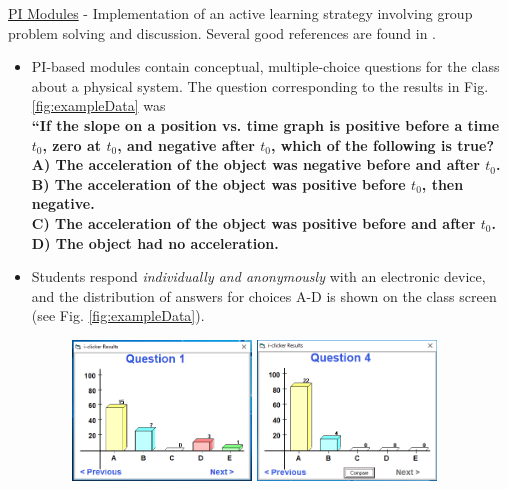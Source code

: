 \documentclass[../../../main.tex]{subfiles}
\begin{document}
\underline{PI Modules} - Implementation of an active learning strategy involving group problem solving and discussion.  Several good references are found in \cite{mazur2013peer} \cite{AAPTPI} \cite{PhysPort}.
\begin{itemize}
\item PI-based modules contain conceptual, multiple-choice questions for the class about a physical system.  The question corresponding to the results in Fig. \ref{fig:exampleData} was \\ \vspace{0.5cm} \textbf{``If the slope on a position vs. time graph is positive before a time $t_0$, zero at $t_0$, and negative after $t_0$, which of the following is true? \\ \vspace{0.5cm} A) The acceleration of the object was negative before and after $t_0$.  \\ B) The acceleration of the object was positive before $t_0$, then negative. \\ C) The acceleration of the object was positive before and after $t_0$. \\ D) The object had no acceleration.}
\item Students respond \textit{individually and anonymously} with an electronic device, and the distribution of answers for choices A-D is shown on the class screen (see Fig. \ref{fig:exampleData}).
\begin{figure}
\centering
\includegraphics[width=0.45\textwidth,trim=0.25cm 1cm 0.15cm 2cm,clip=true]{FirstData.PNG}
\includegraphics[width=0.45\textwidth,trim=0.25cm 1cm 0.15cm 2cm,clip=true]{SecondData.PNG}

\end{figure}
\end{itemize}
\end{document}
